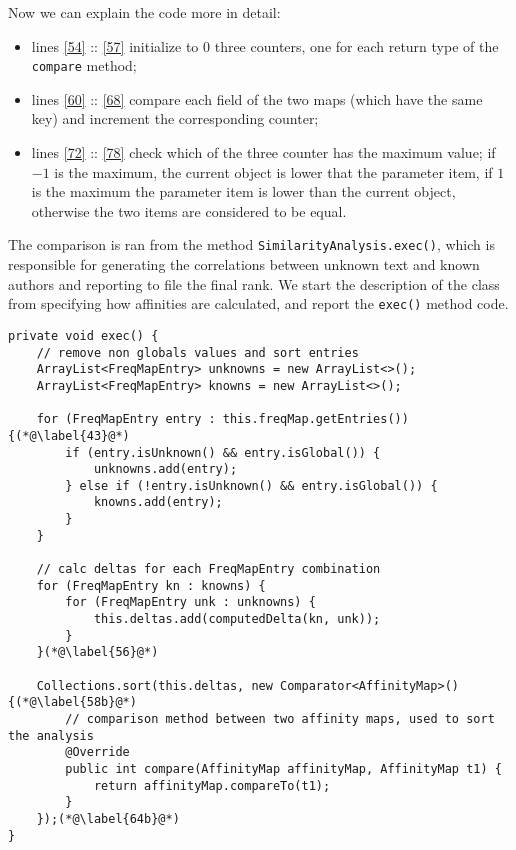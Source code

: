\documentclass[a4paper,11pt, twoside]{article}
\begin{document}
 	Now we can explain the code more in detail: \begin{itemize}
 		\item lines \ref{54} :: \ref{57} initialize to 0 three counters, one for each return type of the \lstinline|compare| method;
 		\item lines \ref{60} :: \ref{68} compare each field of the two maps (which have the same key) and increment the corresponding counter;
 		\item lines \ref{72} :: \ref{78} check which of the three counter has the maximum value; if $-1$ is the maximum, the current object is lower that the parameter item, if $1$ is the maximum the parameter item is lower than the current object, otherwise the two items are considered to be equal.
 	\end{itemize}
 
 	The comparison is ran from the method \lstinline|SimilarityAnalysis.exec()|, which is responsible for generating the correlations between unknown text and known authors and reporting to file the final rank. We start the description of the class from specifying how affinities are calculated, and report the \lstinline|exec()| method code.
 	
 	\begin{lstlisting}[firstnumber=38]
private void exec() {
	// remove non globals values and sort entries
	ArrayList<FreqMapEntry> unknowns = new ArrayList<>();
	ArrayList<FreqMapEntry> knowns = new ArrayList<>();
	
	for (FreqMapEntry entry : this.freqMap.getEntries()) {(*@\label{43}@*)
		if (entry.isUnknown() && entry.isGlobal()) {
			unknowns.add(entry);
		} else if (!entry.isUnknown() && entry.isGlobal()) {
			knowns.add(entry);
		}
	}
	
	// calc deltas for each FreqMapEntry combination
	for (FreqMapEntry kn : knowns) {
		for (FreqMapEntry unk : unknowns) {
			this.deltas.add(computedDelta(kn, unk));
		}
	}(*@\label{56}@*)
	
	Collections.sort(this.deltas, new Comparator<AffinityMap>() {(*@\label{58b}@*)
		// comparison method between two affinity maps, used to sort the analysis
		@Override
		public int compare(AffinityMap affinityMap, AffinityMap t1) {
			return affinityMap.compareTo(t1);
		}
	});(*@\label{64b}@*)
}
 	\end{lstlisting}
 	
\end{document}
